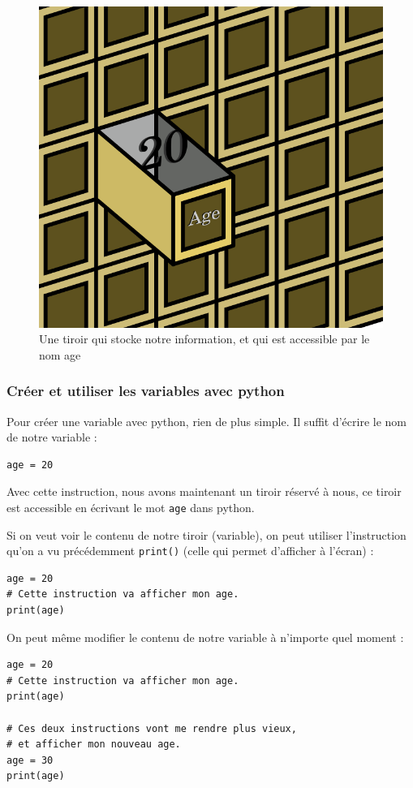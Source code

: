 \documentclass[12pt]{article}
\newcommand{\code}[1]{\colorbox{light-gray}{\texttt{#1}}}
\begin{document}
        \begin{figure}[H]
            \centering
            \includegraphics[width=0.5\linewidth]{img/14_variable.png}
            \caption{Une tiroir qui stocke notre information, et qui est accessible par le nom age}
        \end{figure}

        \subsubsection{Créer et utiliser les variables avec python}
            Pour créer une variable avec python, rien de plus simple. Il suffit d'écrire le nom de notre variable :
            \begin{lstlisting}[style=code]
age = 20
            \end{lstlisting}

            Avec cette instruction, nous avons maintenant un tiroir réservé à nous, ce tiroir est accessible en
            écrivant le mot \code{age} dans python.

            Si on veut voir le contenu de notre tiroir (variable), on peut utiliser
            l'instruction qu'on a vu précédemment \code{print()} (celle qui permet d'afficher à l'écran) :
            \begin{lstlisting}[style=code]
age = 20
# Cette instruction va afficher mon age.
print(age)
            \end{lstlisting}

            On peut même modifier le contenu de notre variable à n'importe quel moment :
            \begin{lstlisting}[style=code]
age = 20
# Cette instruction va afficher mon age.
print(age)

# Ces deux instructions vont me rendre plus vieux,
# et afficher mon nouveau age.
age = 30
print(age)
            \end{lstlisting}
\end{document}
